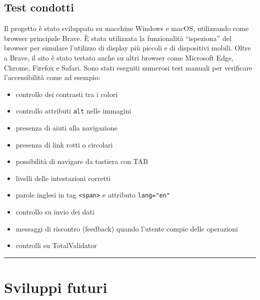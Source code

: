 \documentclass[11pt,a4paper]{article}
\newcommand{\sectionrule}{\vspace{0.5em}\noindent\rule{\linewidth}{0.4pt}\vspace{0.5em}}
\begin{document}
\subsection{Test condotti}
Il progetto \`e stato sviluppato su macchine Windows e macOS, utilizzando come browser principale Brave. \`E stata utilizzata la funzionalit\`a ``ispeziona'' del browser per simulare l'utilizzo di display pi\`u piccoli e di dispositivi mobili. Oltre a Brave, il sito \`e stato testato anche su altri browser come Microsoft Edge, Chrome, Firefox e Safari.
Sono stati eseguiti numerosi test manuali per verificare l'accessibilit\`a come ad esempio:
\begin{itemize}
  \item controllo dei contrasti tra i colori
  \item controllo attributi \texttt{alt} nelle immagini
  \item presenza di aiuti alla navigazione
  \item presenza di link rotti o circolari
  \item possibilit\`a di navigare da tastiera con TAB
  \item livelli delle intestazioni corretti
  \item parole inglesi in tag \texttt{<span>} e attributo \texttt{lang="en"}
  \item controllo su invio dei dati
  \item messaggi di riscontro (feedback) quando l'utente compie delle operazioni
  \item controlli su TotalValidator
\end{itemize}

\sectionrule

\section{Sviluppi futuri}
\end{document}
